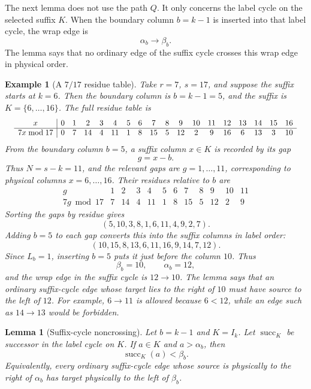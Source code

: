 \documentclass[10pt]{article}
\newtheorem{lemma}{Lemma}
\newtheorem{example}{Example}
\begin{document}
The next lemma does not use the path \(Q\).  It only concerns the label cycle
on the selected suffix \(K\).  When the boundary column \(b=k-1\) is inserted
into that label cycle, the wrap edge is
\[
  \alpha_b\to\beta_b.
\]
The lemma says that no ordinary edge of the suffix cycle crosses this wrap
edge in physical order.

\begin{example}[A \(7/17\) residue table]
Take \(r=7\), \(s=17\), and suppose the suffix starts at \(k=6\).  Then the
boundary column is \(b=k-1=5\), and the suffix is \(K=\{6,\ldots,16\}\).
The full residue table is
\[
\resizebox{.98\textwidth}{!}{$
\begin{array}{c|ccccccccccccccccc}
x&0&1&2&3&4&5&6&7&8&9&10&11&12&13&14&15&16\\ \hline
7x\bmod17&0&7&14&4&11&1&8&15&5&12&2&9&16&6&13&3&10
\end{array}
$}
\]
From the boundary column \(b=5\), a suffix column \(x\in K\) is recorded by
its gap
\[
  g=x-b.
\]
Thus \(N=s-k=11\), and the relevant gaps are \(g=1,\ldots,11\), corresponding
to physical columns \(x=6,\ldots,16\).  Their residues relative to \(b\) are
\[
\begin{array}{c|ccccccccccc}
g&1&2&3&4&5&6&7&8&9&10&11\\ \hline
7g\bmod17&7&14&4&11&1&8&15&5&12&2&9
\end{array}
\]
Sorting the gaps by residue gives
\[
  (5,10,3,8,1,6,11,4,9,2,7).
\]
Adding \(b=5\) to each gap converts this into the suffix columns in label order:
\[
  (10,15,8,13,6,11,16,9,14,7,12).
\]
Since \(L_b=1\), inserting \(b=5\) puts it just before the column \(10\).  Thus
\[
  \beta_b=10,\qquad \alpha_b=12,
\]
and the wrap edge in the suffix cycle is \(12\to10\).  The lemma says that an
ordinary suffix-cycle edge whose target lies to the right of \(10\) must have
source to the left of \(12\).  For example, \(6\to11\) is allowed because
\(6<12\), while an edge such as \(14\to13\) would be forbidden.
\end{example}

\begin{lemma}[Suffix-cycle noncrossing]
Let \(b=k-1\) and \(K=I_k\).  Let \(\operatorname{succ}_K\) be successor in
the label cycle on \(K\).  If \(a\in K\) and \(a>\alpha_b\), then
\[
  \operatorname{succ}_K(a)<\beta_b.
\]
Equivalently, every ordinary suffix-cycle edge whose source is physically to
the right of \(\alpha_b\) has target physically to the left of \(\beta_b\).
\end{lemma}
\end{document}
